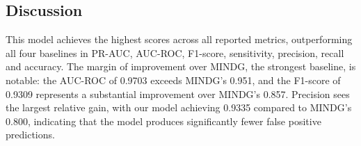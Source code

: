 \begin{table}[htbp]
\centering
\caption{Performance comparison of different methods on BindingDB dataset.
Bold values indicate the best performance in each column.
Results for DeepCDA, TripletMulti-DTI, GAT, and MINDG are reproduced from \citet{Yang2024} and were evaluated using 10-fold cross-validation.
This work uses a fixed train/validation/test split.}
\label{tab:performance-comparison}
%
\end{table}

\subsection{Discussion}
This model achieves the highest scores across all reported metrics, outperforming all four baselines in PR-AUC, AUC-ROC, F1-score, sensitivity, precision, recall and accuracy.
The margin of improvement over MINDG, the strongest baseline, is notable: the AUC-ROC of 0.9703 exceeds MINDG's 0.951, and the F1-score of 0.9309 represents a substantial improvement over MINDG's 0.857.
Precision sees the largest relative gain, with our model achieving 0.9335 compared to MINDG's 0.800, indicating that the model produces significantly fewer false positive predictions.

